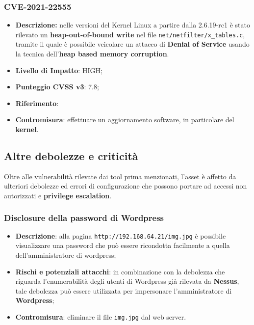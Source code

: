 \documentclass[a4paper, 12pt, oneside]{article}
\begin{document}
\subsubsection{CVE-2021-22555}
\begin{itemize}
    \item \textbf{Descrizione:} nelle versioni del Kernel Linux a partire dalla 2.6.19-rc1 è stato rilevato un \textbf{heap-out-of-bound write} nel file \texttt{net/netfilter/x\_tables.c}, tramite il quale è possibile veicolare un attacco di \textbf{Denial of Service} usando la tecnica dell'\textbf{heap based memory corruption}. 
    \item \textbf{Livello di Impatto}: HIGH;
    \item \textbf{Punteggio CVSS v3}: 7.8;
    \item \textbf{Riferimento}: \cite{22555}
    \item \textbf{Contromisura}: effettuare un aggiornamento software, in particolare del \textbf{kernel}.
\end{itemize}
\newpage

\subsection{Altre debolezze e criticità}
Oltre alle vulnerabilità rilevate dai tool prima menzionati, l'asset è affetto da ulteriori debolezze ed errori di configurazione che possono portare ad accessi non autorizzati e \textbf{privilege escalation}.

\subsubsection{Disclosure della password di Wordpress}
\begin{itemize}
    \item \textbf{Descrizione}: alla pagina \texttt{http://192.168.64.21/img.jpg} è possibile visualizzare una password che può essere ricondotta facilmente a quella dell'amministratore di wordpress;
    \item \textbf{Rischi e potenziali attacchi}: in combinazione con la debolezza che riguarda l'enumerabilità degli utenti di Wordpress già rilevata da \textbf{Nessus}, tale debolezza può essere utilizzata per impersonare l'amministratore di \textbf{Wordpress};
    \item \textbf{Contromisura}: eliminare il file \texttt{img.jpg} dal web server.
\end{itemize}
\end{document}
